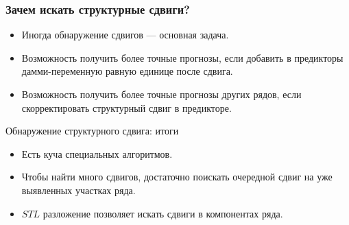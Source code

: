   

\begin{frame}
  \frametitle{Зачем искать структурные сдвиги?}

  \begin{itemize}[<+->]
    \item Иногда обнаружение сдвигов — \alert{основная задача}. 
    \item Возможность получить \alert{более точные} прогнозы, если добавить в предикторы 
    дамми-переменную равную единице после сдвига.
    \item Возможность получить \alert{более точные} прогнозы других рядов, если 
    скорректировать структурный сдвиг в предикторе.
  \end{itemize}
  

\end{frame}


\begin{frame}{Обнаружение структурного сдвига: итоги}

  \begin{itemize}[<+->]
    \item Есть \alert{куча} специальных алгоритмов.
    \item Чтобы найти \alert{много} сдвигов, достаточно поискать очередной сдвиг на 
    уже выявленных участках ряда.
    \item $STL$ разложение позволяет искать \alert{сдвиги в компонентах} ряда.
 \end{itemize}
\end{frame}


